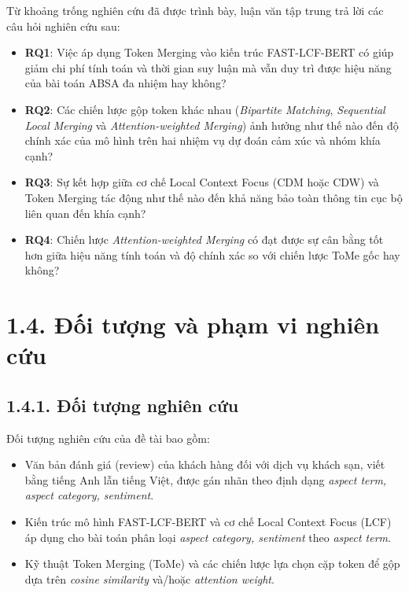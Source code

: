 Từ khoảng trống nghiên cứu đã được trình bày, luận văn tập trung trả lời các câu hỏi nghiên cứu sau:

\begin{itemize}
    \item \textbf{RQ1}: Việc áp dụng Token Merging vào kiến trúc FAST-LCF-BERT có giúp giảm chi phí tính toán và thời gian suy luận mà vẫn duy trì được hiệu năng của bài toán ABSA đa nhiệm hay không?

    \item \textbf{RQ2}: Các chiến lược gộp token khác nhau (\textit{Bipartite Matching}, \textit{Sequential Local Merging} và \textit{Attention-weighted Merging}) ảnh hưởng như thế nào đến độ chính xác của mô hình trên hai nhiệm vụ dự đoán cảm xúc và nhóm khía cạnh?

    \item \textbf{RQ3}: Sự kết hợp giữa cơ chế Local Context Focus (CDM hoặc CDW) và Token Merging tác động như thế nào đến khả năng bảo toàn thông tin cục bộ liên quan đến khía cạnh?

    \item \textbf{RQ4}: Chiến lược \textit{Attention-weighted Merging} có đạt được sự cân bằng tốt hơn giữa hiệu năng tính toán và độ chính xác so với chiến lược ToMe gốc hay không?
\end{itemize}

\section{1.4. Đối tượng và phạm vi nghiên cứu}
 
\subsection{1.4.1. Đối tượng nghiên cứu}
 
Đối tượng nghiên cứu của đề tài bao gồm:
 
\begin{itemize}
  \item Văn bản đánh giá (review) của khách hàng đối với dịch vụ khách sạn, viết bằng tiếng Anh lẫn tiếng Việt, được gán nhãn theo định dạng \textit{aspect term, aspect category, sentiment}.
  \item Kiến trúc mô hình FAST-LCF-BERT và cơ chế Local Context Focus (LCF) áp dụng cho bài toán phân loại \textit{aspect category, sentiment} theo \textit{aspect term}.
  \item Kỹ thuật Token Merging (ToMe) và các chiến lược lựa chọn cặp token để gộp dựa trên \textit{cosine similarity} và/hoặc \textit{attention weight}.
\end{itemize}
 
